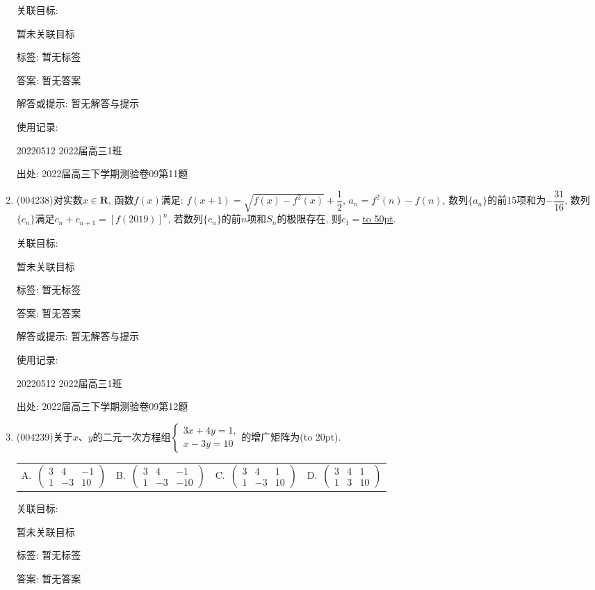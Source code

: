 \documentclass[10pt,a4paper]{article}
\newcommand{\blank}[1]{\underline{\hbox to #1pt{}}}
\newcommand{\bracket}[1]{(\hbox to #1pt{})}
\newcommand{\fourch}[4]{\par\begin{tabular}{p{.23\textwidth}p{.23\textwidth}p{.23\textwidth}p{.23\textwidth}}
A.~#1 &B.~#2& C.~#3& D.~#4
\end{tabular}}
\begin{document}
\begin{enumerate}[1.]
关联目标:

暂未关联目标



标签: 暂无标签

答案: 暂无答案

解答或提示: 暂无解答与提示

使用记录:

20220512	2022届高三1班	


出处: 2022届高三下学期测验卷09第11题
\item { (004238)}对实数$x\in \mathbf{R}$, 函数$f(x)$满足: $f(x+1)=\sqrt{f(x)-{f^2}(x)}+\dfrac 12$, $a_n=f^2(n)-f(n)$,
数列$\{a_n\}$的前$15$项和为$-\dfrac{31}{16}$, 数列$\{c_n\}$满足$c_n+c_{n+1}=[f(2019)]^n$, 若数列$\{c_n\}$的前$n$项和$S_n$的极限存在, 则$c_1=$\blank{50}.


关联目标:

暂未关联目标



标签: 暂无标签

答案: 暂无答案

解答或提示: 暂无解答与提示

使用记录:

20220512	2022届高三1班	


出处: 2022届高三下学期测验卷09第12题
\item { (004239)}关于$x$、$y$的二元一次方程组$\begin{cases} 3x+4y=1,\\ x-3y=10 \end{cases}$的增广矩阵为\bracket{20}.
\fourch{$\begin{pmatrix}3&4&-1\\1&-3&10\end{pmatrix}$}{$\begin{pmatrix}3&4&-1\\1&-3&-10\end{pmatrix}$}{$\begin{pmatrix}3&4&1\\1&-3&10\end{pmatrix}$}{$\begin{pmatrix}3&4&1\\1&3&10\end{pmatrix}$}


关联目标:

暂未关联目标



标签: 暂无标签

答案: 暂无答案


\end{enumerate}
\end{document}
